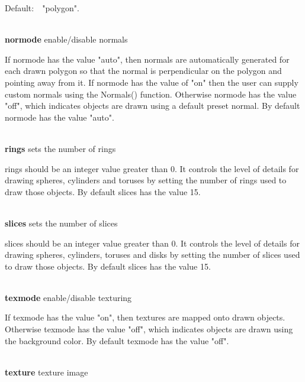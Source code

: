 \documentclass[letterpaper]{article}
\begin{document}
{Default:\ \ \textsf{"polygon"}.


\bigskip

\noindent\hrulefill\\
\noindent\textsf{\textbf{normode}} \hfill enable/disable normals


\bigskip

If normode has the value \textsf{"auto"}, then normals are
automatically generated for each drawn polygon so that the normal is
perpendicular on the polygon and pointing away from it. If normode has
the value of "on" then the user can supply custom normals using the
\textsf{Normals()} function. Otherwise normode has the value
\textsf{"off"}, which indicates objects are drawn using a default
preset normal. By default normode has the value \textsf{"auto".}

\noindent\hrulefill\\
\noindent\textsf{\textbf{rings}} \hfill sets the number of rings


\bigskip

rings should be an integer value greater than 0. It controls the level
of details for drawing spheres, cylinders and toruses by setting the
number of rings used to draw those objects. By default slices has the
value 15.


\bigskip

\noindent\hrulefill\\
\noindent\textsf{\textbf{slices}} \hfill sets the number of slices


\bigskip

slices should be an integer value greater than 0. It controls the
level of details for drawing spheres, cylinders, toruses and disks by
setting the number of slices used to draw those objects. By default
slices has the value 15.


\bigskip

\noindent\hrulefill\\
\noindent\textsf{\textbf{texmode}} \hfill enable/disable texturing


\bigskip

If texmode has the value \textsf{"on"}, then textures are mapped
onto drawn objects. Otherwise texmode has the value
\textsf{"off"}, which indicates objects are drawn using the
background color. By default texmode has the value \textsf{"off".}

\noindent\hrulefill\\
\noindent\textsf{\textbf{texture}} \hfill texture image


\bigskip

}
\end{document}

